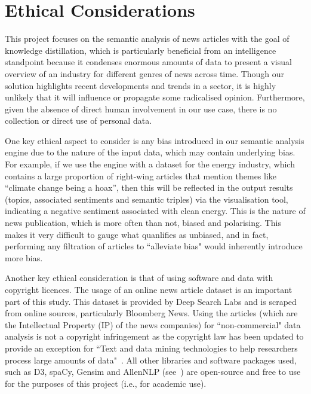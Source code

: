 
\section{Ethical Considerations}
This project focuses on the semantic analysis of news articles with the goal of knowledge distillation, which is particularly beneficial from an intelligence standpoint because it condenses enormous amounts of data to present a visual overview of an industry for different genres of news across time.  Though our solution highlights recent developments and trends in a sector, it is highly unlikely that it will influence or propagate some radicalised opinion. Furthermore, given the absence of direct human involvement in our use case, there is no collection or direct use of personal data.

One key ethical aspect to consider is any bias introduced in our semantic analysis engine due to the nature of the input data, which may contain underlying bias. For example, if we use the engine with a dataset for the energy industry, which contains a large proportion of right-wing articles that mention themes like ``climate change being a hoax'', then this will be reflected in the output results (topics, associated sentiments and semantic triples) via the visualisation tool, indicating a negative sentiment associated with clean energy. This is the nature of news publication, which is more often than not, biased and polarising. This makes it very difficult to gauge what quanlifies as unbiased, and in fact, performing any filtration of articles to ``alleviate bias" would inherently introduce more bias.

Another key ethical consideration is that of using software and data with copyright licences. The usage of an online news article dataset is an important part of this study. This dataset is provided by Deep Search Labs and is scraped from online sources, particularly Bloomberg News. Using the articles (which are the Intellectual Property (IP) of the news companies) for ``non-commercial" data analysis is not a copyright infringement as the copyright law has been updated to provide an exception for ``Text and data mining technologies to help researchers process large amounts of data"~\cite{exceptions_to_copyright}. All other libraries and software packages used, such as D3, spaCy, Gensim and AllenNLP (see~) are open-source and free to use for the purposes of this project (i.e., for academic use).